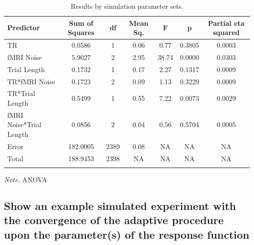 \documentclass[
  english,
  man,floatsintext]{apa6}
\begin{document}
\begin{table}[tbp]

\begin{center}
\begin{threeparttable}

\caption{\label{tab:unnamed-chunk-2}Results by simulation parameter sets.}

\begin{tabular}{lcccccc}
\toprule
Predictor & \multicolumn{1}{c}{Sum of Squares} & \multicolumn{1}{c}{df} & \multicolumn{1}{c}{Mean Sq.} & \multicolumn{1}{c}{F} & \multicolumn{1}{c}{p} & \multicolumn{1}{c}{Partial eta squared}\\
\midrule
TR & 0.0586 & 1 & 0.06 & 0.77 & 0.3805 & 0.0003\\
fMRI Noise & 5.9027 & 2 & 2.95 & 38.74 & 0.0000 & 0.0303\\
Trial Length & 0.1732 & 1 & 0.17 & 2.27 & 0.1317 & 0.0009\\
TR*fMRI Noise & 0.1723 & 2 & 0.09 & 1.13 & 0.3229 & 0.0009\\
TR*Trial Length & 0.5499 & 1 & 0.55 & 7.22 & 0.0073 & 0.0029\\
fMRI Noise*Trial Length & 0.0856 & 2 & 0.04 & 0.56 & 0.5704 & 0.0005\\
Error & 182.0005 & 2389 & 0.08 & NA & NA & NA\\
Total & 188.9453 & 2398 & NA & NA & NA & NA\\
\bottomrule
\addlinespace
\end{tabular}

\begin{tablenotes}[para]
\normalsize{\textit{Note.} ANOVA}
\end{tablenotes}

\end{threeparttable}
\end{center}

\end{table}

\hypertarget{show-an-example-simulated-experiment-with-the-convergence-of-the-adaptive-procedure-upon-the-parameters-of-the-response-function}{%
\subsection{Show an example simulated experiment with the convergence of the adaptive procedure upon the parameter(s) of the response function}\label{show-an-example-simulated-experiment-with-the-convergence-of-the-adaptive-procedure-upon-the-parameters-of-the-response-function}}
\end{document}
